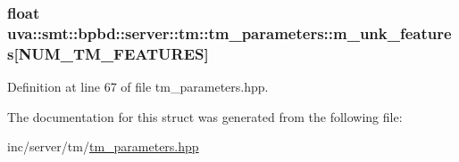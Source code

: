 \hypertarget{structuva_1_1smt_1_1bpbd_1_1server_1_1tm_1_1tm__parameters_a441e613ed28b4998341aaed3893bbd0f}{}
\subsubsection[{m\+\_\+unk\+\_\+features}]{\setlength{\rightskip}{0pt plus 5cm}float uva\+::smt\+::bpbd\+::server\+::tm\+::tm\+\_\+parameters\+::m\+\_\+unk\+\_\+features\mbox{[}N\+U\+M\+\_\+\+T\+M\+\_\+\+F\+E\+A\+T\+U\+R\+E\+S\mbox{]}}\label{structuva_1_1smt_1_1bpbd_1_1server_1_1tm_1_1tm__parameters_a441e613ed28b4998341aaed3893bbd0f}


Definition at line 67 of file tm\+\_\+parameters.\+hpp.



The documentation for this struct was generated from the following file\+:\begin{DoxyCompactItemize}
\item 
inc/server/tm/\hyperlink{tm__parameters_8hpp}{tm\+\_\+parameters.\+hpp}\end{DoxyCompactItemize}
